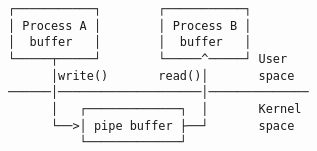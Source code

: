 \documentclass[varwidth,crop]{standalone}
\begin{document}
\begin{verbatim}
┌───────────┐        ┌───────────┐
│ Process A │        │ Process B │
│  buffer   │        │  buffer   │
└─────┬─────┘        └─────^─────┘ User
      │write()       read()│       space
──────│────────────────────│──────────────
      │   ┌─────────────┐  │       Kernel
      └──>│ pipe buffer ├──┘       space
          └─────────────┘
\end{verbatim}
\end{document}
